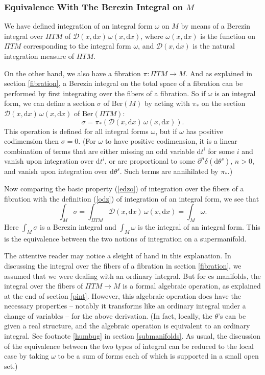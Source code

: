 \documentclass[11pt,a4paper]{article}
\def\D{{\mathcal D}}
\def\d{{\mathrm d}}
\def\D{{\mathcal D}}
\def\Ber{{\mathrm {Ber}}}
\def\Pi{\varPi}
\begin{document}
  



\subsubsection{Equivalence With The Berezin Integral on $M$}\label{dirred}

We have defined integration of an integral form $\omega$ on $M$ by means of a Berezin integral over   ${\Pi} TM$
of $\D(x,\d x)\,\omega(x,\d x)$, where $\omega(x,\d x)$ is the function on ${\Pi} TM$ corresponding to the integral form
$\omega$, and $\D(x,\d x)$ is the natural integration measure of ${\Pi} TM$. 

On the other hand, we also have a fibration $\pi:{\Pi} TM\to M$.  And as explained in section \ref{fibration},
a Berezin integral on the total space of a fibration can be performed by first integrating over the fibers of a fibration.  So
if $\omega$ is an integral form, we can define a section $\sigma$ of $\Ber(M)$ by acting with $\pi_*$ on the section
$\D(x,\d x)\,\omega(x,\d x)$ of $\Ber({\Pi} TM)$:
\begin{equation}\label{budz}\sigma=\pi_*\left(\D(x,\d x)\,\omega(x,\d x)\right).\end{equation}
This operation is defined for all integral forms $\omega$, but if $\omega$ has positive codimension then $\sigma=0$.
(For $\omega$ to have positive codimension, it is a linear combination of terms that are  either missing an odd variable $\d t^i$ for some $i $
and vanish
upon integration over $\d t^i$, or are proportional to some $\partial^n\delta(\d \theta^s)$, $n>0$, and vanish upon integration over $\d\theta^s$. Such terms
are annihilated by $\pi_*$.)


Now comparing the basic property (\ref{edzo}) of integration over the fibers of a fibration with the definition (\ref{odz}) of
integration of an integral form, we see that
\begin{equation}\label{odox}\int_M\sigma=\int_{{\Pi} TM}\D(x,\d x)\,\omega(x,\d x)=\int_M\omega.\end{equation}
Here $\int_M\sigma$ is a Berezin integral and $\int_M\omega$ is the integral of an integral form.
This is the equivalence between the two notions of integration on a supermanifold.

The attentive reader may notice a sleight of hand in this explanation.  In discussing the integral over the fibers
of a fibration in section \ref{fibration}, we assumed that we were dealing with an ordinary integral.  But for cs manifolds, the integral
over the fibers of ${\Pi} TM\to M$ is a formal algebraic operation, as explained at the end of section \ref{pint}.  However, this algebraic
operation does have the necessary properties -- notably it transforms like an ordinary integral under a change of variables -- for the above derivation.
(In fact, locally, the $\theta$'s can be given a real structure, and the algebraic operation is equivalent to an ordinary integral.  See footnote \ref{humbug} in section
\ref{submanifolds}.
As usual, the discussion
of the equivalence between the two types of integral can be reduced to the local case by taking $\omega$ to be a sum of forms each of which is supported
in a small open set.)
\end{document}
